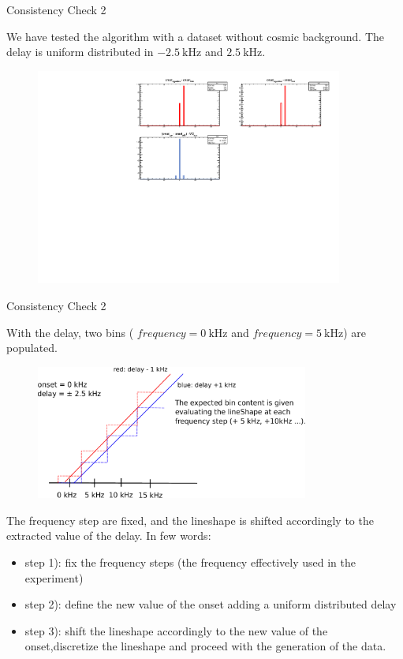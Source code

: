 \documentclass[9pt]{beamer}
\begin{document}
\begin{frame}{Consistency Check 2}

We have tested the algorithm with a dataset without cosmic background. The delay is uniform distributed in $\SI{-2.5}{\kilo \hertz}$ and $\SI{+2.5}{\kilo \hertz}$.

\begin{figure}
\includegraphics[width = 0.9\textwidth]{../Plot/OnsetResult7.pdf}
\end{figure} 
\end{frame}

\begin{frame}{Consistency Check 2}

With the delay, two bins ( $frequency = \SI{0}{\kilo \hertz}$ and $frequency = \SI{5}{\kilo \hertz}$) are populated.

\begin{figure}
\includegraphics[width = 0.8\textwidth]{ExplainingAlgorithm2.pdf}
\end{figure}

The frequency step are fixed, and the lineshape is shifted accordingly to the extracted value of the delay. In few words:
\begin{itemize}
\item step 1): fix the frequency steps (the frequency effectively used in the experiment)
\item step 2): define the new value of the onset adding a uniform distributed delay  
\item step 3): shift the lineshape accordingly to the new value of the onset,\newline discretize the lineshape and proceed with the generation of the data.
\end{itemize}
\end{frame}
\end{document}

